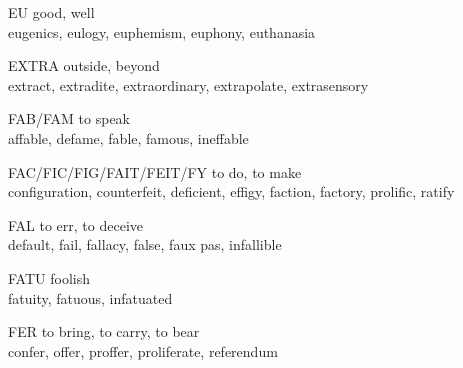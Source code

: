 \begin{flashcard}[Roots]{EU}
good, well\\
\vspace{0.2in}
eugenics, eulogy, euphemism, euphony, euthanasia\\
\end{flashcard}

\begin{flashcard}[Roots]{EXTRA}
outside, beyond\\
\vspace{0.2in}
extract, extradite, extraordinary, extrapolate, extrasensory\\
\end{flashcard}

\begin{flashcard}[Roots]{FAB/FAM}
to speak\\
\vspace{0.2in}
affable, defame, fable, famous, ineffable\\
\end{flashcard}

\begin{flashcard}[Roots]{FAC/FIC/FIG/FAIT/FEIT/FY}
to do, to make\\
\vspace{0.2in}
configuration, counterfeit, deficient, effigy, faction, factory, prolific, ratify\\
\end{flashcard}

\begin{flashcard}[Roots]{FAL}
to err, to deceive\\
\vspace{0.2in}
default, fail, fallacy, false, faux pas, infallible\\
\end{flashcard}

\begin{flashcard}[Roots]{FATU}
foolish\\
\vspace{0.2in}
fatuity, fatuous, infatuated\\
\end{flashcard}

\begin{flashcard}[Roots]{FER}
to bring, to carry, to bear\\
\vspace{0.2in}
confer, offer, proffer, proliferate, referendum\\
\end{flashcard}

